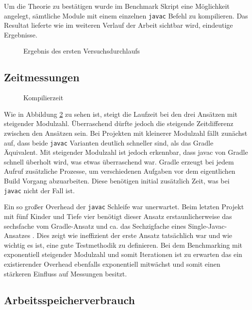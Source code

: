 Um die Theorie zu bestätigen wurde im Benchmark Skript eine Möglichkeit angelegt, sämtliche Module mit einem einzelnen \texttt{javac} Befehl zu kompilieren.
Das Resultat lieferte wie im weiteren Verlauf der Arbeit sichtbar wird, eindeutige Ergebnisse.

\begin{figure}
	
	\caption{Ergebnis des ersten Versuchsdurchlaufs}
	\label{fig:proto-result}
\end{figure}


\subsection{Zeitmessungen}


\begin{figure}
	
	\caption{Kompilierzeit}
	\label{fig:compile-time}
\end{figure}

Wie in Abbildung \ref{fig:compile-time} zu sehen ist, steigt die Laufzeit bei den drei Ansätzen mit steigender Modulzahl. 
Überraschend dürfte jedoch die steigende Zeitdifferenz zwischen den Ansätzen sein.
Bei Projekten mit kleinerer Modulzahl fällt zunächst auf, dass beide \texttt{javac} Varianten deutlich schneller sind, als das Gradle Äquivalent. 
Mit steigender Modulzahl ist jedoch erkennbar, dass javac von Gradle schnell überholt wird, was etwas überraschend war.
Gradle erzeugt bei jedem Aufruf zusätzliche Prozesse, um verschiedenen Aufgaben vor dem eigentlichen Build Vorgang abzuarbeiten. 
Diese benötigen initial zusätzlich Zeit, was bei \texttt{javac} nicht der Fall ist.

Ein so großer Overhead der \texttt{javac} Schleife war unerwartet.
Beim letzten Projekt mit fünf Kinder und Tiefe vier benötigt dieser Ansatz erstaunlicherweise das sechsfache vom Gradle-Ansatz und ca. das Sechzigfache eines Single-Javac-Ansatzes . 
Dies zeigt wie ineffizient der erste Ansatz tatsächlich war und wie wichtig es ist, eine gute Testmethodik zu definieren.
Bei dem Benchmarking mit exponentiell steigender Modulzahl und somit Iterationen ist zu erwarten das ein existierender Overhead ebenfalls exponentiell mitwächst und somit einen stärkeren Einfluss auf Messungen besitzt. 

\subsection{Arbeitsspeicherverbrauch}

